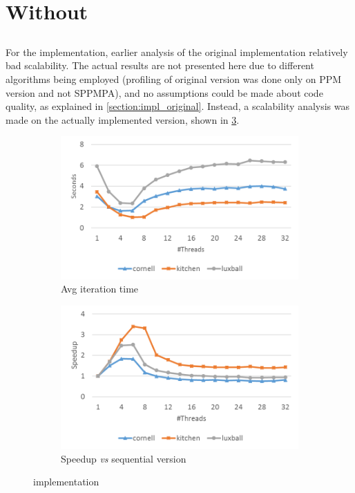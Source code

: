 \documentclass[main.tex]{subfiles}
\begin{document}
\section{Without \starpu} \label{sec:prof:cpu}

\subsection{\cpu}

For the \cpu implementation, earlier analysis of the original implementation relatively bad scalability. The actual results are not presented here due to different algorithms being employed (profiling of original version was done only on PPM version and not SPPMPA), and no assumptions could be made about code quality, as explained in \cref{section:impl_original}.
Instead, a scalability analysis was made on the actually implemented \cpu version, shown in \cref{fig:prof:cpu}.

\begin{figure}[!htp]
  \centering
  \begin{subfigure}{.5\textwidth}
    \centering
    \includegraphics[width=\linewidth]{profiling/cpu_time}
    \caption{Avg iteration time \label{fig:prof:cpu_time}}
  \end{subfigure}%
  \begin{subfigure}{.5\textwidth}
    \centering
    \includegraphics[width=\linewidth]{profiling/cpu_speedup}
    \caption{Speedup \textit{vs} sequential version \label{fig:prof:cpu_speedup}}
  \end{subfigure}
  \caption{\cpu implementation \label{fig:prof:cpu}}
\end{figure}
\end{document}
